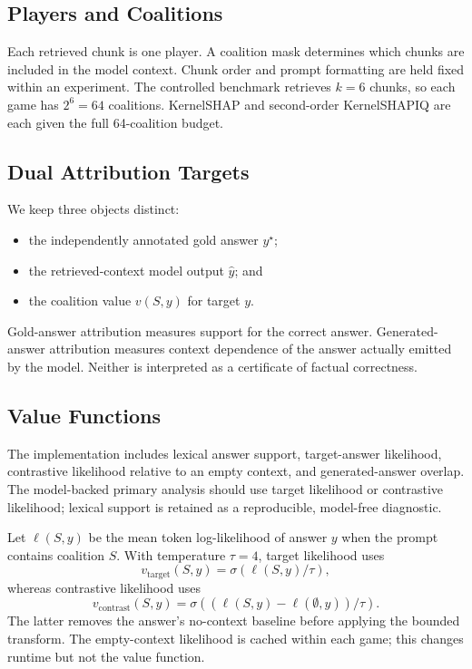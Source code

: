 \documentclass[10pt]{article}
\begin{document}
\subsection{Players and Coalitions}
Each retrieved chunk is one player. A coalition mask determines which chunks
are included in the model context. Chunk order and prompt formatting are held
fixed within an experiment. The controlled benchmark retrieves $k=6$ chunks,
so each game has $2^6=64$ coalitions. KernelSHAP and second-order KernelSHAPIQ
are each given the full 64-coalition budget.

\subsection{Dual Attribution Targets}
We keep three objects distinct:
\begin{itemize}
  \item the independently annotated gold answer $y^\star$;
  \item the retrieved-context model output $\hat{y}$; and
  \item the coalition value $v(S, y)$ for target $y$.
\end{itemize}
Gold-answer attribution measures support for the correct answer. Generated-
answer attribution measures context dependence of the answer actually emitted
by the model. Neither is interpreted as a certificate of factual correctness.

\subsection{Value Functions}
The implementation includes lexical answer support, target-answer likelihood,
contrastive likelihood relative to an empty context, and generated-answer
overlap. The model-backed primary analysis should use target likelihood or
contrastive likelihood; lexical support is retained as a reproducible,
model-free diagnostic.

Let $\ell(S,y)$ be the mean token log-likelihood of answer $y$ when the prompt
contains coalition $S$. With temperature $\tau=4$, target likelihood uses
\begin{equation}
v_{\mathrm{target}}(S,y)=\sigma\left(\ell(S,y)/\tau\right),
\end{equation}
whereas contrastive likelihood uses
\begin{equation}
v_{\mathrm{contrast}}(S,y)=
\sigma\left((\ell(S,y)-\ell(\emptyset,y))/\tau\right).
\end{equation}
The latter removes the answer's no-context baseline before applying the
bounded transform. The empty-context likelihood is cached within each game;
this changes runtime but not the value function.
\end{document}
